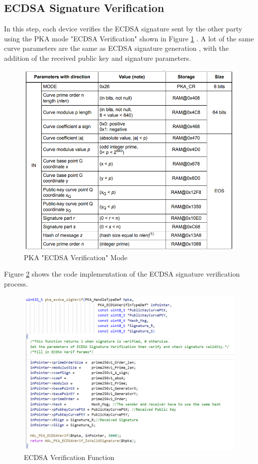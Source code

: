     \subsection{ECDSA Signature Verification}
    In this step, each device verifies the ECDSA signature sent by the other party using the PKA mode "ECDSA Verification" shown in Figure \ref{fig:ecdsa verif} \cite{U5_Refman}.
    A lot of the same curve parameters are the same as ECDSA signature generation , with the addition of the received public key and signature parameters.
    \begin{figure}[H]
    \centering
    \includegraphics[width=16cm]{img/ecdsa verify.png}
    \caption{PKA "ECDSA Verification" Mode}
    \label{fig:ecdsa verif}
    \end{figure}

    Figure \ref{fig:ecdsa verif func} shows the code implementation of the ECDSA signature verification process.
    \begin{figure}[H]
    \centering
    \includegraphics[width=18cm]{img/ecdsa verif func.png}
    \caption{ECDSA Verification Function }
    \label{fig:ecdsa verif func}
    \end{figure}
    
